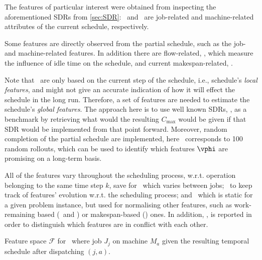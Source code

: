 The features of particular interest were obtained from inspecting the aforementioned SDRs from \cref{sec:SDR}:  
\phiJobRelated\ and \phiMacRelated\ are job-related and machine-related attributes of the current schedule, respectively. 

Some features are directly observed from the partial schedule, such as the job- and machine-related features. 
In addition there are flow-related, \phiFlowRelated, which measure the influence of idle time on the schedule, 
and current makespan-related, \phiScheduleRelated.

Note that \phiLocalRelated\ are only based on the current step of the schedule, i.e., schedule's \emph{local features}, and might not give an accurate indication of how it will effect the schedule in the long run. Therefore, a set of features are needed to estimate the schedule's \emph{global features}. The approach here is to use well known SDRs, \phiSDRRelated, as a benchmark by retrieving what would the resulting $C_{\max}$ would be given if that SDR would be implemented from that point forward. Moreover, random completion of the partial schedule are implemented, here \phiRND\ corresponds to 100 random rollouts, which can be used to identify which features $\vphi$ are promising on a long-term basis.  

All of the features vary throughout the scheduling process, w.r.t. operation belonging to the same time step $k$, save for \phitotalProc\ which varies between jobs; \phistep\ to keep track of features' evolution w.r.t. the scheduling process; and \phiwrmTotal\ which is static for a given problem instance, but used for normalising other features, such as work-remaining based (\phiwrmJob\ and \phiwrmMac) or makespan-based (\phiGlobalRelated) ones.
In addition, \phimac, is reported in order to distinguish which features are in conflict with each other.

\begin{table} \centering 
  \caption[Feature space $\mathcal{F}$ for \JSP]{Feature space $\mathcal{F}$ for \JSP\ where job $J_j$ on machine $M_a$ given the resulting temporal schedule after dispatching $(j,a)$.}
  \label{tbl:features}
  
\end{table}



